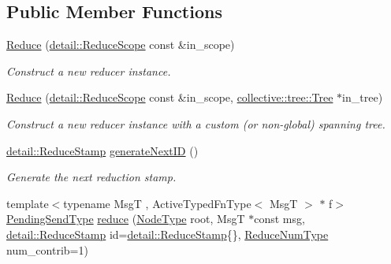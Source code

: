 \subsection*{Public Member Functions}
\begin{DoxyCompactItemize}
\item 
\hyperlink{structvt_1_1collective_1_1reduce_1_1_reduce_a5e5a3c0e00259bec5aad517aeaba36ac}{Reduce} (\hyperlink{structvt_1_1collective_1_1reduce_1_1detail_1_1_reduce_scope}{detail\+::\+Reduce\+Scope} const \&in\+\_\+scope)
\begin{DoxyCompactList}\small\item\em Construct a new reducer instance. \end{DoxyCompactList}\item 
\hyperlink{structvt_1_1collective_1_1reduce_1_1_reduce_a346fd6b262828a501c342330fc091fec}{Reduce} (\hyperlink{structvt_1_1collective_1_1reduce_1_1detail_1_1_reduce_scope}{detail\+::\+Reduce\+Scope} const \&in\+\_\+scope, \hyperlink{structvt_1_1collective_1_1tree_1_1_tree}{collective\+::tree\+::\+Tree} $\ast$in\+\_\+tree)
\begin{DoxyCompactList}\small\item\em Construct a new reducer instance with a custom (or non-\/global) spanning tree. \end{DoxyCompactList}\item 
\hyperlink{namespacevt_1_1collective_1_1reduce_1_1detail_aacc1fcd729d934ba143fee3a943bf9e7}{detail\+::\+Reduce\+Stamp} \hyperlink{structvt_1_1collective_1_1reduce_1_1_reduce_ac279b15e3bb5754d03307e2fe23ec734}{generate\+Next\+ID} ()
\begin{DoxyCompactList}\small\item\em Generate the next reduction stamp. \end{DoxyCompactList}\item 
{\footnotesize template$<$typename MsgT , Active\+Typed\+Fn\+Type$<$ Msg\+T $>$ $\ast$ f$>$ }\\\hyperlink{structvt_1_1collective_1_1reduce_1_1_reduce_a0474b491f3c93014d9a0ce0356c6bfd5}{Pending\+Send\+Type} \hyperlink{structvt_1_1collective_1_1reduce_1_1_reduce_adf8bd9748a220a3ed29087c30f8adafc}{reduce} (\hyperlink{namespacevt_a866da9d0efc19c0a1ce79e9e492f47e2}{Node\+Type} root, MsgT $\ast$const msg, \hyperlink{namespacevt_1_1collective_1_1reduce_1_1detail_aacc1fcd729d934ba143fee3a943bf9e7}{detail\+::\+Reduce\+Stamp} id=\hyperlink{namespacevt_1_1collective_1_1reduce_1_1detail_aacc1fcd729d934ba143fee3a943bf9e7}{detail\+::\+Reduce\+Stamp}\{\}, \hyperlink{structvt_1_1collective_1_1reduce_1_1_reduce_a6c3e63aca10c31d2823b0b18cf9762a4}{Reduce\+Num\+Type} num\+\_\+contrib=1)

\end{DoxyCompactItemize}
